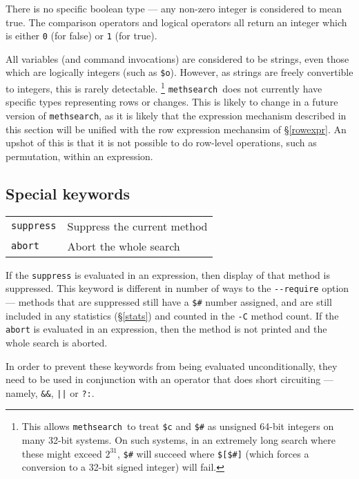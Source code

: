 \documentclass[a4paper,11pt,oneside]{book}
\makeatletter
\newcommand{\oi}[1]{\index{#1@{\hspace*{-\optwidth}\texttt{-}\texttt{#1}}}}
\newcommand{\fspec}[1]{\index{#1@{\hspace*{-\fspecwidth}\texttt{\$#1}}}}
\def\methsearch{\texttt{meth\-search}}
\newcommand{\sref}[1]{\hyperref[#1]{\S\ref{#1}}}
\makeatother
\begin{document}
There is no specific boolean type --- any non-zero
integer is considered to mean true.  The comparison operators and logical 
operators all return an integer which is either \verb+0+ (for false) or 
\verb+1+ (for true).

All variables (and command invocations) are considered to be strings,
even those which are logically integers (such as \verb+$o+).  However,
as strings are freely convertible to integers, this is rarely detectable.%
\footnote{This allows \methsearch\ to treat \verb+$c+\fspec{c} and \verb+$#+
as unsigned 64-bit integers on many 32-bit systems.  On such systems, 
in an extremely long search where these might exceed $2^{31}$, 
\verb+$#+ will succeed where \verb+$[$#]+ (which forces a conversion to a
32-bit signed integer) will fail.}
\methsearch\ does not currently have specific types representing rows or
changes.  This is likely to change in a future version of \methsearch, 
as it is likely that the expression mechanism described in this section will
be unified with the row expression mechansim of 
\sref{rowexpr}.  An upshot of this is that it is not possible to do row-level
operations, such as permutation, within an expression.

\subsection{Special keywords}\label{exprkey}

\begin{tabular}{ll}
\verb+suppress+& Suppress the current method\\
\verb+abort+&    Abort the whole search\\
\end{tabular}

If the \verb+suppress+
is evaluated in an expression, then display of that method is suppressed. 
This keyword is different in number of ways to the \verb+--require+
option --- methods that are suppressed still have a \verb+$#+ number assigned,
and are still included in any statistics (\sref{stats}) and counted in the
\verb+-C+\oi{C} method count.
If the \verb+abort+ 
is evaluated in an expression, then the method is not printed and the
whole search is aborted.

In order to prevent these keywords from being evaluated unconditionally,
they need to be used in conjunction with an operator that does short circuiting%
 --- namely, \verb+&&+, \verb+||+ or 
\verb+?:+.
%
\end{document}

